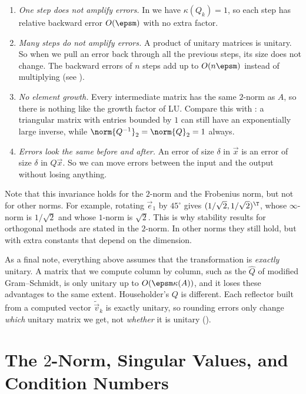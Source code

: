 \begin{enumerate}
  \item \emph{One step does not amplify errors.} In  we have $\kappa(Q_k) = 1$, so each step has relative backward error $O(\epsm)$ with no extra factor.
  \item \emph{Many steps do not amplify errors.} A product of unitary matrices is unitary. So when we pull an error back through all the previous steps, its size does not change. The backward errors of $n$ steps add up to $O(n\epsm)$ instead of multiplying (see ).
  \item \emph{No element growth.} Every intermediate matrix has the same $2$-norm as $A$, so there is nothing like the growth factor of LU. Compare this with : a triangular matrix with entries bounded by $1$ can still have an exponentially large inverse, while $\norm{Q^{-1}}_2 = \norm{Q}_2 = 1$ always.
  \item \emph{Errors look the same before and after.} An error of size $\delta$ in $\vec{x}$ is an error of size $\delta$ in $Q\vec{x}$. So we can move errors between the input and the output without losing anything.
\end{enumerate}

Note that this invariance holds for the $2$-norm and the Frobenius norm, but not for other norms. For example, rotating $\vec{e}_1$ by $45^\circ$ gives $(1/\sqrt{2}, 1/\sqrt{2})^\T$, whose $\infty$-norm is $1/\sqrt{2}$ and whose $1$-norm is $\sqrt{2}$. This is why stability results for orthogonal methods are stated in the $2$-norm. In other norms they still hold, but with extra constants that depend on the dimension.

As a final note, everything above assumes that the transformation is \emph{exactly} unitary. A matrix that we compute column by column, such as the $\hat{Q}$ of modified Gram--Schmidt, is only unitary up to $O(\epsm\kappa(A))$, and it loses these advantages to the same extent. Householder's $Q$ is different. Each reflector built from a computed vector $\tilde{\vec{v}}_k$ is exactly unitary, so rounding errors only change \emph{which} unitary matrix we get, not \emph{whether} it is unitary ().

\section{The $2$-Norm, Singular Values, and Condition Numbers}
\label{sec:twonorm}

